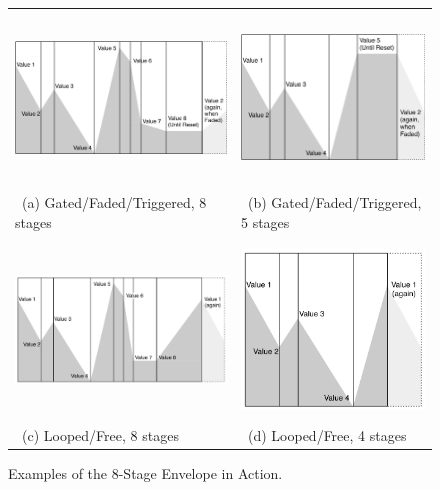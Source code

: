 \documentclass{article}
\begin{document}
\begin{figure}[t]
\begin{center}
\begin{tabular}{@{}ll@{}}
\includegraphics[height=1.8in]{OneShot.pdf}&
\includegraphics[height=1.8in]{OneShotShort.pdf}\\
~(a) Gated/Faded/Triggered, 8 stages&
~(b) Gated/Faded/Triggered, 5 stages\\\\
\includegraphics[height=1.8in]{Looped.pdf}&
\includegraphics[height=1.8in]{LoopedShort.pdf}\\
~(c) Looped/Free, 8 stages&
~(d) Looped/Free, 4 stages
\end{tabular}
\end{center}
\caption{Examples of the 8-Stage Envelope in Action.}
\end{figure}
\end{document}

